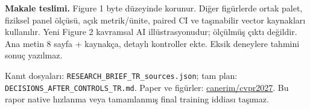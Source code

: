 \documentclass[10pt,a4paper]{article}
\begin{document}
\textbf{Makale teslimi.} Figure 1 byte düzeyinde korunur. Diğer figürlerde
ortak palet, fiziksel panel ölçüsü, açık metrik/ünite, paired CI ve
taşınabilir vector kaynakları kullanılır. Yeni Figure 2 kavramsal AI
illüstrasyonudur; ölçülmüş çıktı değildir. Ana metin 8 sayfa + kaynakça,
detaylı kontroller ekte. Eksik deneylere tahmini sonuç yazılmaz.

{\footnotesize Kanıt dosyaları: \texttt{RESEARCH\_BRIEF\_TR\_sources.json};
tam plan: \texttt{DECISIONS\_AFTER\_CONTROLS\_TR.md}.
Paper ve figürler: \href{https://github.com/canerim/cvpr2027}{canerim/cvpr2027}.
Bu rapor native hızlanma veya tamamlanmış final training iddiası taşımaz.}
\end{document}
